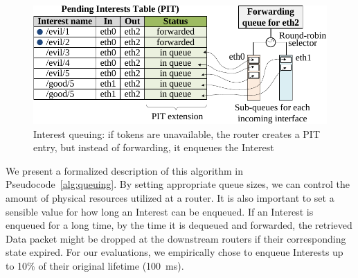 \documentclass[10pt,conference]{IEEEtran}
\begin{document}

\begin{figure}[t]
  \centering
  \includegraphics[scale=0.6]{queue}
  \caption{Interest queuing: if tokens are unavailable, the router creates a PIT entry, but instead of forwarding, it enqueues the Interest}
  \label{fig:queueing}
  \vspace{-0.3cm}
\end{figure}

We present a formalized description of this algorithm in Pseudocode~\ref{alg:queuing}. 
By setting appropriate queue sizes, we can control the amount of physical resources utilized at a router.
It is also important to set a sensible value for how long an Interest can be enqueued. 
If an Interest is enqueued for a long time, by the time it is dequeued and forwarded, the retrieved Data packet might be dropped at the downstream routers if their corresponding state expired. 
For our evaluations, we empirically chose to enqueue Interests up to 10\% of their original lifetime (100~ms).
\end{document}
